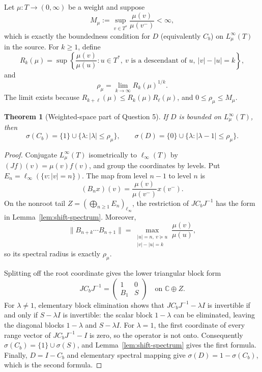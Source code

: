 \documentclass[11pt]{article}
\newtheorem{theorem}{Theorem}
\newcommand{\Cb}{C_b}
\newcommand{\spec}{\sigma}
\begin{document}
Let $\mu:T\to(0,\infty)$ be a weight and suppose
\[
  M_\mu:=\sup_{v\in T^*}\frac{\mu(v)}{\mu(v^-)}<\infty,
\]
which is exactly the boundedness condition for $D$ (equivalently $\Cb$) on
$L_\mu^\infty(T)$ in the source. For $k\ge1$, define
\[
  R_k(\mu)=\sup\left\{
  \frac{\mu(v)}{\mu(u)}:
  u\in T^*,\ v\text{ is a descendant of }u,\ |v|-|u|=k
  \right\},
\]
and
\[
  \rho_\mu=\lim_{k\to\infty}R_k(\mu)^{1/k}.
\]
The limit exists because $R_{k+\ell}(\mu)\le R_k(\mu)R_\ell(\mu)$, and
$0\le\rho_\mu\le M_\mu$.

\begin{theorem}[Weighted-space part of Question 5]\label{thm:weighted-spectrum}
If $D$ is bounded on $L_\mu^\infty(T)$, then
\[
\boxed{\quad
  \spec(\Cb)=\{1\}\cup\{\lambda:|\lambda|\le\rho_\mu\},
  \qquad
  \spec(D)=\{0\}\cup\{\lambda:|\lambda-1|\le\rho_\mu\}.
\quad}
\]
\end{theorem}

\begin{proof}
Conjugate $L_\mu^\infty(T)$ isometrically to $\ell_\infty(T)$ by
$(Jf)(v)=\mu(v)f(v)$, and group the coordinates by levels. Put
$E_n=\ell_\infty(\{v:|v|=n\})$. The map from level $n-1$ to level $n$ is
\[
  (B_nx)(v)=\frac{\mu(v)}{\mu(v^-)}x(v^-).
\]
On the nonroot tail $Z=(\bigoplus_{n\ge1}E_n)_{\ell_\infty}$, the restriction
of $J\Cb J^{-1}$ has the form in Lemma~\ref{lem:shift-spectrum}. Moreover,
\[
 \|B_{n+k}\cdots B_{n+1}\|
 =\max_{\substack{|u|=n,\ v\succeq u\\|v|-|u|=k}}
 \frac{\mu(v)}{\mu(u)},
\]
so its spectral radius is exactly $\rho_\mu$.

Splitting off the root coordinate gives the lower triangular block form
\[
  J\Cb J^{-1}=
  \begin{pmatrix}
    1&0\\ B_1&S
  \end{pmatrix}
  \quad\text{on }\mathbb C\oplus Z.
\]
For $\lambda\ne1$, elementary block elimination shows that
$J\Cb J^{-1}-\lambda I$ is invertible if and only if $S-\lambda I$ is
invertible: the scalar block $1-\lambda$ can be eliminated, leaving the
diagonal blocks $1-\lambda$ and $S-\lambda I$. For $\lambda=1$, the first
coordinate of every range vector of $J\Cb J^{-1}-I$ is zero, so the operator
is not onto. Consequently $\spec(\Cb)=\{1\}\cup\spec(S)$, and
Lemma~\ref{lem:shift-spectrum} gives the first formula. Finally, $D=I-\Cb$
and elementary spectral mapping give $\spec(D)=1-\spec(\Cb)$, which is the
second formula.
\end{proof}
\end{document}
